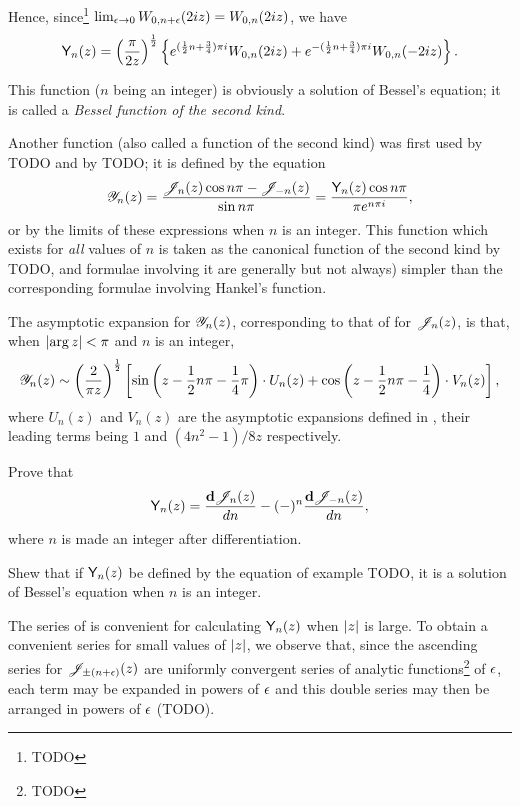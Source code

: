 Hence, since\footnote{TODO}
$\lim_{\epsilon\rightarrow 0} W_{0,n+\epsilon}(2iz) = W_{0,n}(2iz)$, we
have
$$
\mathsf{Y}_{n}(z)
=
\left(  \frac{\pi}{2z}  \right)^{\frac{1}{2}}
\left\{ 
  e^{(\frac{1}{2} n + \frac{3}{4}) \pi i} W_{0,n}(2iz)
  +
  e^{-(\frac{1}{2} n + \frac{3}{4})\pi i} W_{0,n}(-2iz)
 \right\}.
$$

This function ($n$ being an integer) is obviously a solution of
Bessel's equation; it is called a \emph{Bessel function of the
  second kind}.

Another function (also called a function of the second kind) was
first used by TODO and by TODO; it is defined by the equation
$$
\mathscr{Y}_{n}(z) = \frac{\mathscr{J}_{n}(z) \cos n\pi - \mathscr{J}_{-n}(z)}{\sin n\pi}
= \frac{\mathsf{Y}_{n}(z) \cos n\pi}{\pi e^{n\pi i}},
$$
% 
% 
or by the limits of these expressions when $n$ is an integer. This
function which exists for \emph{all} values of $n$ is taken as the
canonical function of the second kind by TODO, and formulae
involving it are generally but not always) simpler than the
corresponding formulae involving Hankel's function.

The asymptotic expansion for $\mathscr{Y}_{n}(z)$, corresponding to that of
 for $\mathscr{J}_{n}(z)$, is that, when
$\left| \arg z \right| < \pi$ and $n$ is an integer,
$$
\mathscr{Y}_{n}(z)
\sim
\left(  \frac{2}{\pi z}  \right)^{\frac{1}{2}}
\left[  \sin\left( z - \frac{1}{2} n \pi - \frac{1}{4} \pi \right)
  \cdot U_{n}(z)
  + \cos\left( z - \frac{1}{2} n \pi - \frac{1}{4} \right) \cdot V_{n}(z)
 \right],
$$
where $U_{n}(z)$ and $V_{n}(z)$ are the asymptotic expansions defined
in , their leading terms being $1$ and
$(4n^{2}-1)/8z$ respectively.
\begin{wandwexample}
  Prove that
  $$
  \mathsf{Y}_{n}(z)
  =
  \frac{\mathbf{d}\mathscr{J}_{n}(z)}{dn}
  -
  (-)^{n} \frac{\mathbf{d}\mathscr{J}_{-n}(z)}{dn},
  $$
  where $n$ is made an integer after differentiation.
\end{wandwexample}
\begin{wandwexample}
  Shew that if $\mathsf{Y}_{n}(z)$ be defined by the equation of example
  TODO, it is a solution of Bessel's equation when $n$ is an integer.
\end{wandwexample}
The series of  is convenient for calculating
$\mathsf{Y}_{n}(z)$ when $\left| z \right|$ is large. To obtain a convenient
series for small values of $\left| z \right|$, we observe that, since
the ascending series for $\mathscr{J}_{\pm (n+\epsilon)}(z)$ are uniformly
convergent series of analytic functions\footnote{TODO} of $\epsilon$,
each term may be expanded in powers of $\epsilon$ and this double
series may then be arranged in powers of
$\epsilon$ (TODO).

